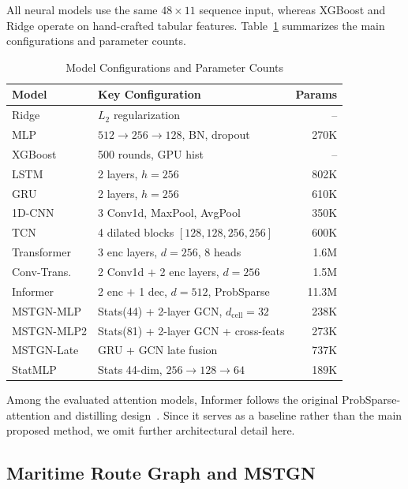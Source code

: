 \documentclass[sigconf,anonymous]{acmart}%
\begin{document}
All neural models use the same $48 \times 11$ sequence input, whereas XGBoost and Ridge operate on hand-crafted tabular features. Table~\ref{tab:model_configs} summarizes the main configurations and parameter counts.

\begin{table}[t]
    \centering
    \caption{Model Configurations and Parameter Counts}
    \label{tab:model_configs}
    \begin{tabular}{llr}
        \toprule
        \textbf{Model} & \textbf{Key Configuration} & \textbf{Params} \\
        \midrule
        Ridge & $L_2$ regularization & -- \\
        MLP & $512{\to}256{\to}128$, BN, dropout & 270K \\
        XGBoost & 500 rounds, GPU hist & -- \\
        \midrule
        LSTM & 2 layers, $h{=}256$ & 802K \\
        GRU & 2 layers, $h{=}256$ & 610K \\
        \midrule
        1D-CNN & 3 Conv1d, MaxPool, AvgPool & 350K \\
        TCN & 4 dilated blocks $[128,128,256,256]$ & 600K \\
        \midrule
        Transformer & 3 enc layers, $d{=}256$, 8 heads & 1.6M \\
        Conv-Trans. & 2 Conv1d $+$ 2 enc layers, $d{=}256$ & 1.5M \\
        Informer & 2 enc $+$ 1 dec, $d{=}512$, ProbSparse & 11.3M \\
        \midrule
        MSTGN-MLP & Stats(44) + 2-layer GCN, $d_\text{cell}{=}32$ & 238K \\
        MSTGN-MLP2 & Stats(81) + 2-layer GCN + cross-feats & 273K \\
        MSTGN-Late & GRU + GCN late fusion & 737K \\
        StatMLP & Stats 44-dim, $256{\to}128{\to}64$ & 189K \\
        \bottomrule
    \end{tabular}
\end{table}

Among the evaluated attention models, Informer follows the original ProbSparse-attention and distilling design~\cite{zhou2021informer}. Since it serves as a baseline rather than the main proposed method, we omit further architectural detail here.

\subsection{Maritime Route Graph and MSTGN}
\label{sec:mstgn}
\end{document}
